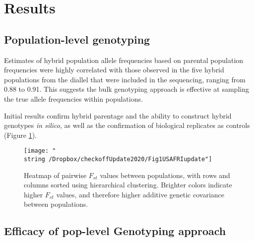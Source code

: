 \documentclass[12pt, letterpaper]{article}
\begin{document}
\section{Results}



\subsection{Population-level genotyping}

Estimates of hybrid population allele frequencies based on parental population frequencies were highly correlated with those observed in the five hybrid populations from the diallel that were included in the sequencing, ranging from 0.88 to 0.91. This suggests the bulk genotyping approach is effective at sampling the true allele frequencies within populations. 



Initial results confirm hybrid parentage and the ability to construct hybrid genotypes \emph{in silico}, as well as the confirmation of biological replicates as controls (Figure \ref{heatmap}). 

\begin{figure}
\texttt{[image: "\\string~/Dropbox/checkoffUpdate2020/Fig1USAFRIupdate"]}
\caption{Heatmap of pairwise $F_{st}$ values between populations, with rows and columns sorted using hierarchical clustering. Brighter colors indicate higher $F_{st}$ values, and therefore higher additive genetic covariance between populations.}
\label{heatmap}
\end{figure}


\subsection{Efficacy of pop-level Genotyping approach}
\end{document}
